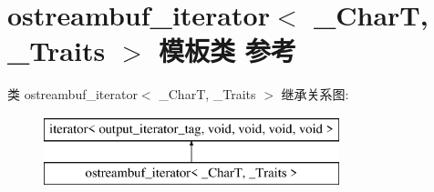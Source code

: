 \hypertarget{classostreambuf__iterator}{}\section{ostreambuf\+\_\+iterator$<$ \+\_\+\+CharT, \+\_\+\+Traits $>$ 模板类 参考}
\label{classostreambuf__iterator}
类 ostreambuf\+\_\+iterator$<$ \+\_\+\+CharT, \+\_\+\+Traits $>$ 继承关系图\+:\begin{figure}[H]
\begin{center}
\leavevmode
\includegraphics[height=2.000000cm]{classostreambuf__iterator}
\end{center}
\end{figure}
